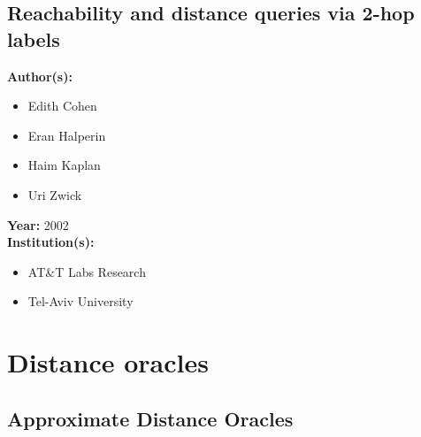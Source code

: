 \documentclass[a4paper]{article}
\newenvironment{itemizesp}
{
    \begin{itemize}
}
{
    \end{itemize}
}
\newcommand{\textbff}[1]{{\large \textbf{#1}}}
\begin{document}
        \subsection{Reachability and distance queries via 2-hop labels}
        \label{subsec:2hop}

        \textbff{Author(s): }
        \begin{itemizesp}
            \item Edith Cohen
            \item Eran Halperin
            \item Haim Kaplan
            \item Uri Zwick
        \end{itemizesp}
        \textbff{Year: }2002 \\
        \textbff{Institution(s): }
        \begin{itemizesp}
            \item AT\&T Labs Research
            \item Tel-Aviv University
        \end{itemizesp}

    \pagebreak
    \section{Distance oracles}

        \subsection{Approximate Distance Oracles}
        \label{subsec:apxdo}
\end{document}
